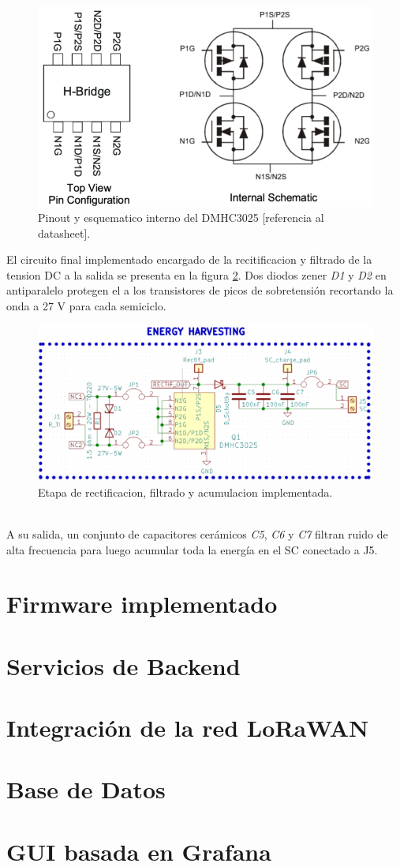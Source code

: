 \begin{figure}[h]
	\centering
	\includegraphics[width=0.7\linewidth]{Figures/esquematico_interno_rctificador_mosfet}
	\caption{Pinout y esquematico interno del DMHC3025 [referencia al datasheet].}
	\label{fig:esquematicointernorctificadormosfet}
\end{figure}
El circuito final implementado encargado de la recitificacion y filtrado de la tension DC a la salida se presenta en la figura \ref{fig:ctorectificacionfiltrado}. Dos diodos zener \textit{D1} y \textit{D2} en antiparalelo protegen el a los transistores  de picos de sobretensión recortando la onda a 27 V para cada semiciclo.\\
\begin{figure}
	\centering
	\includegraphics[width=0.7\linewidth]{Figures/cto_rectificacion_filtrado}
	\caption{Etapa de rectificacion, filtrado y acumulacion implementada.}
	\label{fig:ctorectificacionfiltrado}
\end{figure}\\
A su salida, un conjunto de capacitores cerámicos \textit{C5}, \textit{C6} y \textit{C7} filtran ruido de alta frecuencia para luego acumular toda la energía en el SC conectado a J5.\\

 
\section{Firmware implementado}

\section{Servicios de Backend}

\section{Integraci\'{o}n de la red LoRaWAN}

\section{Base de Datos}

\section{GUI basada en Grafana}

